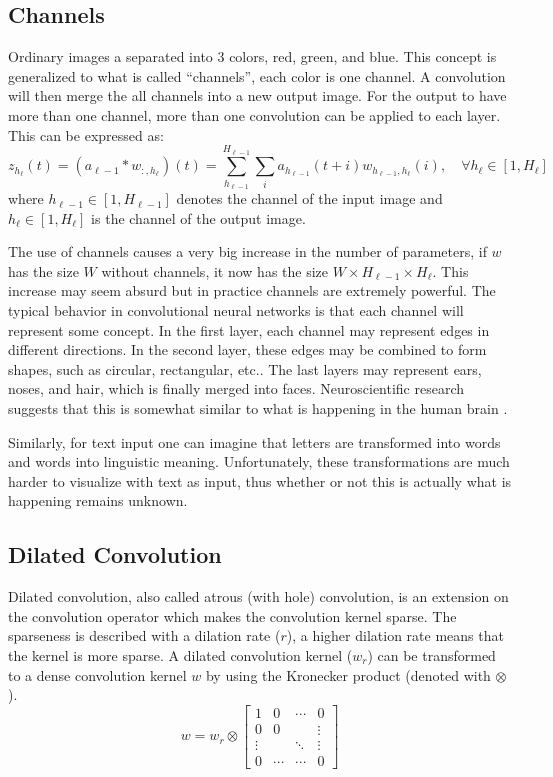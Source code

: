 \subsection{Channels}
Ordinary images a separated into 3 colors, red, green, and blue. This concept is generalized to what is called ``channels'', each color is one channel. A convolution will then merge the all channels into a new output image. For the output to have more than one channel, more than one convolution can be applied to each layer. This can be expressed as:
\begin{equation}
z_{h_\ell}(t) = (a_{\ell-1} * w_{:, h_\ell})(t) = \sum_{h_{\ell-1}}^{H_{\ell-1}} \sum_{i} a_{h_{\ell-1}}(t + i) w_{h_{\ell-1}, h_\ell}(i), \quad \forall h_\ell \in [1, H_\ell]
\end{equation}
where $h_{\ell-1} \in [1, H_{\ell-1}]$ denotes the channel of the input image and $h_\ell \in [1, H_\ell]$ is the channel of the output image.

The use of channels causes a very big increase in the number of parameters, if $w$ has the size $W$ without channels, it now has the size $W \times H_{\ell-1} \times H_\ell$. This increase may seem absurd but in practice channels are extremely powerful. The typical behavior in convolutional neural networks is that each channel will represent some concept. In the first layer, each channel may represent edges in different directions. In the second layer, these edges may be combined to form shapes, such as circular, rectangular, etc.. The last layers may represent ears, noses, and hair, which is finally merged into faces. Neuroscientific research suggests that this is somewhat similar to what is happening in the human brain \cite[chapter 9.10]{deep-learning}.

Similarly, for text input one can imagine that letters are transformed into words and words into linguistic meaning. Unfortunately, these transformations are much harder to visualize with text as input, thus whether or not this is actually what is happening remains unknown.

\subsection{Dilated Convolution}

Dilated convolution, also called atrous (with hole) convolution, is an extension on the convolution operator which makes the convolution kernel sparse. The sparseness is described with a dilation rate ($r$), a higher dilation rate means that the kernel is more sparse. A dilated convolution kernel ($w_r$) can be transformed to a dense convolution kernel $w$ by using the Kronecker product (denoted with $\otimes$).
\begin{equation}
w = w_r \otimes \begin{bmatrix}
1      & 0      & \cdots & 0      \\
0      & 0      &        & \vdots \\
\vdots &        & \ddots & \vdots \\
0      & \cdots & \cdots & 0
\end{bmatrix}
\end{equation}

